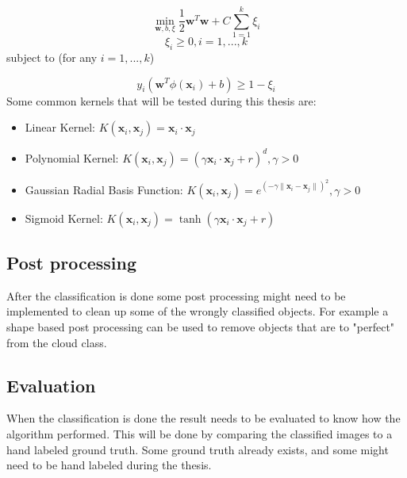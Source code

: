 \documentclass{article}
\begin{document}
\begin{equation}
\min_{\textbf{w},b, \xi} \dfrac{1}{2}\textbf{w}^{T}\textbf{w} + C\sum_{1 = 1}^{k}\xi_{i}
\end{equation}
\begin{equation*}
\xi_{i} \geq 0, i = 1,...,k
\end{equation*}
subject to (for any $ i = 1,...,k $)

\begin{equation*}
y_{i}(\textbf{w}^{T}\phi(\textbf{x}_{i}) + b) \geq 1 - \xi_{i}
\end{equation*}
Some common kernels that will be tested during this thesis are: \\
\begin{itemize}
\item Linear Kernel: $K(\textbf{x}_i,\textbf{x}_{j}) = \textbf{x}_i\cdot\textbf{x}_{j}$

\item Polynomial Kernel: $K(\textbf{x}_i,\textbf{x}_{j}) = (\gamma\textbf{x}_i\cdot\textbf{x}_{j} + r)^d, \gamma > 0$

\item Gaussian Radial Basis Function: $K(\textbf{x}_i,\textbf{x}_{j}) = e^{(-\gamma\|\textbf{x}_i-\textbf{x}_{j}\|)^2}, \gamma > 0$

\item Sigmoid Kernel: $K(\textbf{x}_i,\textbf{x}_{j}) = \tanh(\gamma\textbf{x}_i\cdot\textbf{x}_{j} + r)$
\end{itemize}

\subsection{Post processing}

After the classification is done some post processing might need to be implemented to clean up some of the wrongly classified objects. For example a shape based post processing can be used to remove objects that are to "perfect" from the cloud class.

\subsection{Evaluation}
When the classification is done the result needs to be evaluated to know how the algorithm performed. This will be done by comparing the classified images to a hand labeled ground truth. Some ground truth already exists, and some might need to be hand labeled during the thesis. 
\end{document}

